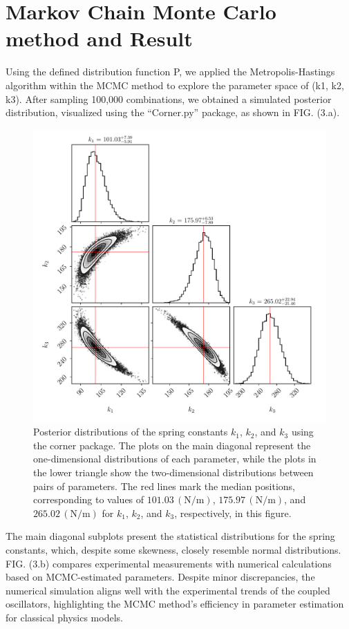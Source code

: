 \documentclass[12pt, a4paper]{article}%
\begin{document}
\section{Markov Chain Monte Carlo method and Result}
Using the defined distribution function P, we applied the Metropolis-Hastings algorithm within the MCMC method to explore the parameter space of (k1, k2, k3). After sampling 100,000 combinations, we obtained a simulated posterior distribution, visualized using the “Corner.py” package, as shown in FIG. (3.a). 
	\begin{figure}[h]
	\centering
	\includegraphics[width=0.5\linewidth]{../paper/image/MCMC_corner.pdf}
	\caption{Posterior distributions of the spring constants $k_1$, $k_2$, and $k_3$ using the corner package. The plots on the main diagonal represent the one-dimensional distributions of each parameter, while the plots in the lower triangle show the two-dimensional distributions between pairs of parameters. The red lines mark the median positions, corresponding to values of $101.03\,(\mathrm{N/m})$, $175.97\,(\mathrm{N/m})$, and $265.02\,(\mathrm{N/m})$ for $k_1$, $k_2$, and $k_3$, respectively, in this figure.}
	\label{fig:MCMC_corner}
	\end{figure}

The main diagonal subplots present the statistical distributions for the spring constants, which, despite some skewness, closely resemble normal distributions. 
FIG. (3.b) compares experimental measurements with numerical calculations based on MCMC-estimated parameters. Despite minor discrepancies, the numerical simulation aligns well with the experimental trends of the coupled oscillators, highlighting the MCMC method's efficiency in parameter estimation for classical physics models.

\end{document}

